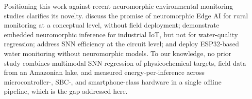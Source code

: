{\sloppy Positioning this work against recent neuromorphic environmental-monitoring studies clarifies its novelty. \citet{aral2024} discuss the promise of neuromorphic Edge AI for rural monitoring at a conceptual level, without field deployment; \citet{azadi2025} demonstrate embedded neuromorphic inference for industrial IoT, but not for water-quality regression; \citet{huijbregts2024} address SNN efficiency at the circuit level; and \citet{alshareeda2025} deploy ESP32-based water monitoring without neuromorphic models. To our knowledge, no prior study combines multimodal SNN regression of physicochemical targets, field data from an Amazonian lake, and measured energy-per-inference across microcontroller-, SBC-, and smartphone-class hardware in a single offline pipeline, which is the gap addressed here.\par}

